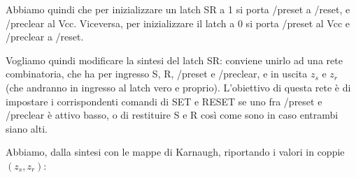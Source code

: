 \documentclass[a4paper,11pt]{article}
\begin{document}
Abbiamo quindi che per inizializzare un latch SR a 1 si porta /preset a /reset, e /preclear al Vcc.
Viceversa, per inizializzare il latch a 0 si porta /preset al Vcc e /preclear a /reset.

Vogliamo quindi modificare la sintesi del latch SR: conviene unirlo ad una rete combinatoria, che ha per ingresso S, R, /preset e /preclear, e in uscita $z_s$ e $z_r$ (che andranno in ingresso al latch vero e proprio).
L'obiettivo di questa rete è di impostare i corrispondenti comandi di SET e RESET se uno fra /preset e /preclear è attivo basso, o di restituire S e R così come sono in caso entrambi siano alti. 

Abbiamo, dalla sintesi con le mappe di Karnaugh, riportando i valori in coppie $(z_s, z_r)$:

\begin{center}
	\begin{karnaugh-map}[4][4][1][/preclear][/preset][R][S]
	\end{karnaugh-map}
\end{center}
\end{document}
